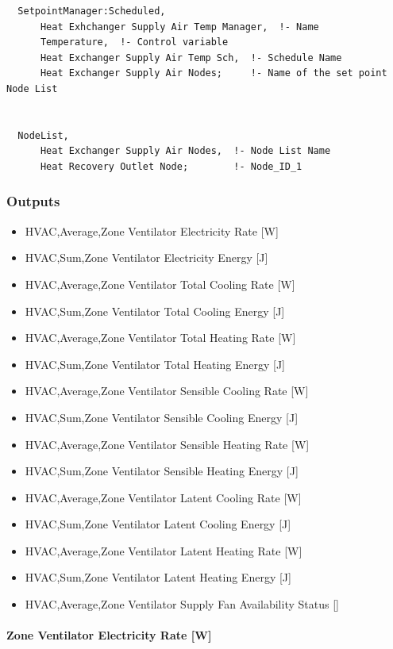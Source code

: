 \begin{lstlisting}
  SetpointManager:Scheduled,
      Heat Exhchanger Supply Air Temp Manager,  !- Name
      Temperature,  !- Control variable
      Heat Exchanger Supply Air Temp Sch,  !- Schedule Name
      Heat Exchanger Supply Air Nodes;     !- Name of the set point Node List


  NodeList,
      Heat Exchanger Supply Air Nodes,  !- Node List Name
      Heat Recovery Outlet Node;        !- Node_ID_1
\end{lstlisting}

\subsubsection{Outputs}\label{outputs-11-006}

\begin{itemize}
\item
  HVAC,Average,Zone Ventilator Electricity Rate {[}W{]}
\item
  HVAC,Sum,Zone Ventilator Electricity Energy {[}J{]}
\item
  HVAC,Average,Zone Ventilator Total Cooling Rate {[}W{]}
\item
  HVAC,Sum,Zone Ventilator Total Cooling Energy {[}J{]}
\item
  HVAC,Average,Zone Ventilator Total Heating Rate {[}W{]}
\item
  HVAC,Sum,Zone Ventilator Total Heating Energy {[}J{]}
\item
  HVAC,Average,Zone Ventilator Sensible Cooling Rate {[}W{]}
\item
  HVAC,Sum,Zone Ventilator Sensible Cooling Energy {[}J{]}
\item
  HVAC,Average,Zone Ventilator Sensible Heating Rate {[}W{]}
\item
  HVAC,Sum,Zone Ventilator Sensible Heating Energy {[}J{]}
\item
  HVAC,Average,Zone Ventilator Latent Cooling Rate {[}W{]}
\item
  HVAC,Sum,Zone Ventilator Latent Cooling Energy {[}J{]}
\item
  HVAC,Average,Zone Ventilator Latent Heating Rate {[}W{]}
\item
  HVAC,Sum,Zone Ventilator Latent Heating Energy {[}J{]}
\item
  HVAC,Average,Zone Ventilator Supply Fan Availability Status {[]}
\end{itemize}

\paragraph{Zone Ventilator Electricity Rate {[}W{]}}\label{zone-ventilator-electric-power-w}

